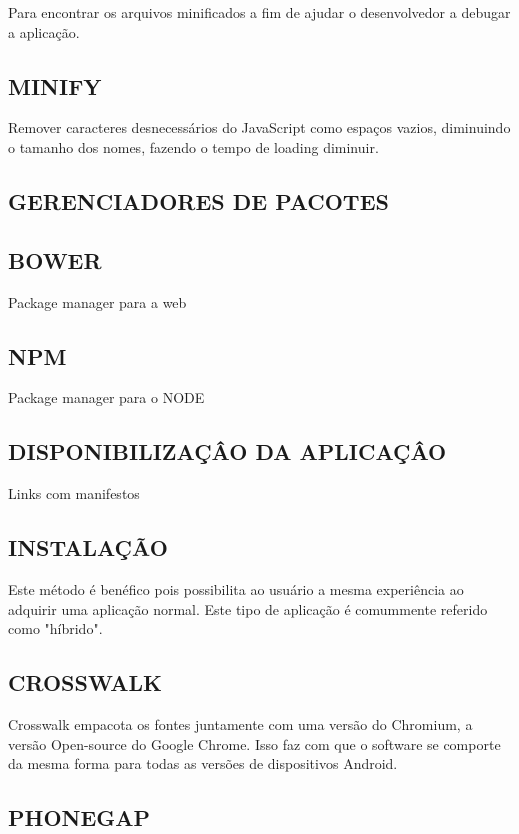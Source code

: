 \documentclass[11pt,a4paper]{article}
\begin{document}
Para encontrar os arquivos minificados a fim de ajudar o desenvolvedor a debugar a aplicação.

\subsection{ MINIFY}

Remover caracteres desnecessários do JavaScript como espaços vazios, diminuindo o tamanho dos nomes, fazendo o tempo de loading diminuir.

\subsection{ GERENCIADORES DE PACOTES}

\subsection{ BOWER}

Package manager para a web

\subsection{ NPM}

Package manager para o NODE

\subsection{ DISPONIBILIZAÇÂO DA APLICAÇÂO}

Links com manifestos

\subsection{ INSTALAÇÃO}

Este método é benéfico pois possibilita ao usuário a mesma experiência ao adquirir uma aplicação normal. Este tipo de aplicação é comummente referido como "híbrido".

\subsection{ CROSSWALK}

Crosswalk empacota os fontes juntamente com uma versão do Chromium, a versão Open-source do Google Chrome. Isso faz com que o software se comporte da mesma forma para todas as versões de dispositivos Android.

\subsection{ PHONEGAP}
\end{document}
